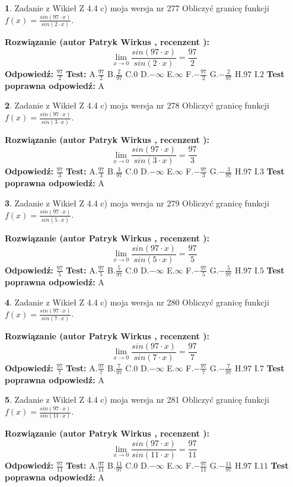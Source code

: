 \documentclass[12pt, a4paper]{article}
\theoremstyle{definition} %
\newtheorem{zad}{}
\newcommand{\zadStart}[1]{\begin{zad}#1\newline}
\newcommand{\zadStop}{\end{zad}}
\newcommand{\rozwStart}[2]{\noindent \textbf{Rozwiązanie (autor #1 , recenzent #2): }\newline}
\newcommand{\rozwStop}{\newline}
\newcommand{\odpStart}{\noindent \textbf{Odpowiedź:}\newline}
\newcommand{\odpStop}{\newline}
\newcommand{\testStart}{\noindent \textbf{Test:}\newline}
\newcommand{\testStop}{\newline}
\newcommand{\kluczStart}{\noindent \textbf{Test poprawna odpowiedź:}\newline}
\newcommand{\kluczStop}{\newline}
\begin{document}
\zadStart{Zadanie z Wikieł Z 4.4 c) moja wersja nr 277}
Obliczyć granicę funkcji $f(x)=\frac{sin(97\cdot x)}{sin(2\cdot x)}$.
\zadStop
\rozwStart{Patryk Wirkus}{}
$$\lim\limits_{x\to 0}\frac{sin(97\cdot x)}{sin(2\cdot x)}=
\frac{97}{2}$$
\rozwStop
\odpStart
$\frac{97}{2}$
\odpStop
\testStart
A.$\frac{97}{2}$
B.$\frac{2}{97}$
C.$0$
D.$-\infty$
E.$\infty$
F.$-\frac{97}{2}$
G.$-\frac{2}{97}$
H.$97$
I.$2$
\testStop
\kluczStart
A
\kluczStop



\zadStart{Zadanie z Wikieł Z 4.4 c) moja wersja nr 278}
Obliczyć granicę funkcji $f(x)=\frac{sin(97\cdot x)}{sin(3\cdot x)}$.
\zadStop
\rozwStart{Patryk Wirkus}{}
$$\lim\limits_{x\to 0}\frac{sin(97\cdot x)}{sin(3\cdot x)}=
\frac{97}{3}$$
\rozwStop
\odpStart
$\frac{97}{3}$
\odpStop
\testStart
A.$\frac{97}{3}$
B.$\frac{3}{97}$
C.$0$
D.$-\infty$
E.$\infty$
F.$-\frac{97}{3}$
G.$-\frac{3}{97}$
H.$97$
I.$3$
\testStop
\kluczStart
A
\kluczStop



\zadStart{Zadanie z Wikieł Z 4.4 c) moja wersja nr 279}
Obliczyć granicę funkcji $f(x)=\frac{sin(97\cdot x)}{sin(5\cdot x)}$.
\zadStop
\rozwStart{Patryk Wirkus}{}
$$\lim\limits_{x\to 0}\frac{sin(97\cdot x)}{sin(5\cdot x)}=
\frac{97}{5}$$
\rozwStop
\odpStart
$\frac{97}{5}$
\odpStop
\testStart
A.$\frac{97}{5}$
B.$\frac{5}{97}$
C.$0$
D.$-\infty$
E.$\infty$
F.$-\frac{97}{5}$
G.$-\frac{5}{97}$
H.$97$
I.$5$
\testStop
\kluczStart
A
\kluczStop



\zadStart{Zadanie z Wikieł Z 4.4 c) moja wersja nr 280}
Obliczyć granicę funkcji $f(x)=\frac{sin(97\cdot x)}{sin(7\cdot x)}$.
\zadStop
\rozwStart{Patryk Wirkus}{}
$$\lim\limits_{x\to 0}\frac{sin(97\cdot x)}{sin(7\cdot x)}=
\frac{97}{7}$$
\rozwStop
\odpStart
$\frac{97}{7}$
\odpStop
\testStart
A.$\frac{97}{7}$
B.$\frac{7}{97}$
C.$0$
D.$-\infty$
E.$\infty$
F.$-\frac{97}{7}$
G.$-\frac{7}{97}$
H.$97$
I.$7$
\testStop
\kluczStart
A
\kluczStop



\zadStart{Zadanie z Wikieł Z 4.4 c) moja wersja nr 281}
Obliczyć granicę funkcji $f(x)=\frac{sin(97\cdot x)}{sin(11\cdot x)}$.
\zadStop
\rozwStart{Patryk Wirkus}{}
$$\lim\limits_{x\to 0}\frac{sin(97\cdot x)}{sin(11\cdot x)}=
\frac{97}{11}$$
\rozwStop
\odpStart
$\frac{97}{11}$
\odpStop
\testStart
A.$\frac{97}{11}$
B.$\frac{11}{97}$
C.$0$
D.$-\infty$
E.$\infty$
F.$-\frac{97}{11}$
G.$-\frac{11}{97}$
H.$97$
I.$11$
\testStop
\kluczStart
A
\kluczStop
\end{document}

